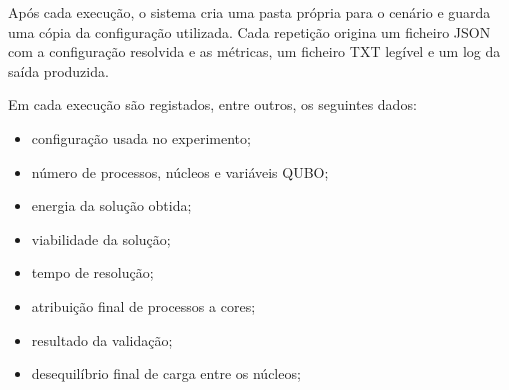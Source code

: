 Após cada execução, o sistema cria uma pasta própria para o cenário e guarda uma
cópia da configuração utilizada. Cada repetição origina um ficheiro JSON com a
configuração resolvida e as métricas, um ficheiro TXT legível e um log da saída produzida.

Em cada execução são registados, entre outros, os seguintes dados:

\begin{itemize}
    \item configuração usada no experimento;
    \item número de processos, núcleos e variáveis QUBO;
    \item energia da solução obtida;
    \item viabilidade da solução;
    \item tempo de resolução;
    \item atribuição final de processos a cores;
    \item resultado da validação;
    \item desequilíbrio final de carga entre os núcleos;
\end{itemize}
